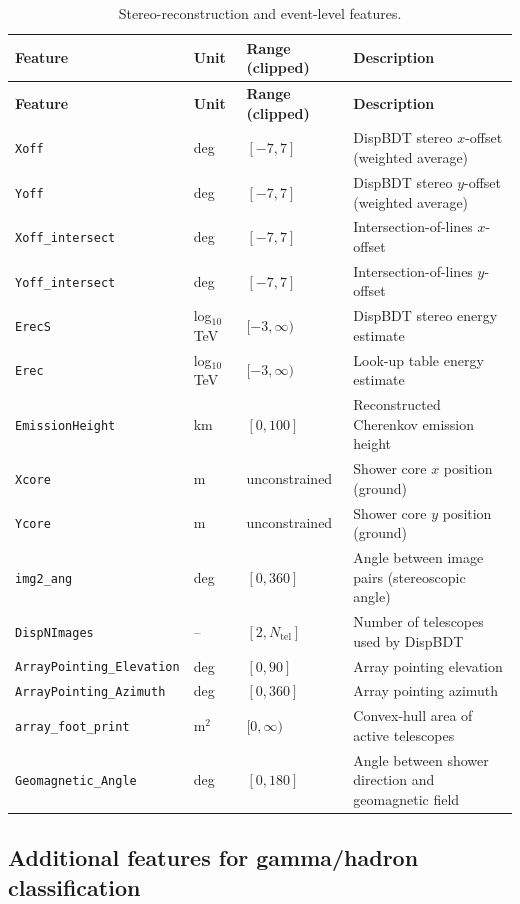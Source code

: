 \documentclass[12pt]{article}
\begin{document}
\begin{longtable}{lll p{5.5cm}}
\caption{Stereo-reconstruction and event-level features.} \label{tab:features-stereo} \\
\hline
\textbf{Feature} & \textbf{Unit} & \textbf{Range (clipped)} & \textbf{Description} \\
\hline
\endfirsthead
\hline
\textbf{Feature} & \textbf{Unit} & \textbf{Range (clipped)} & \textbf{Description} \\
\hline
\endhead
\hline
\endfoot
\texttt{Xoff} & deg & $[-7,7]$ & DispBDT stereo $x$-offset (weighted average) \\
\texttt{Yoff} & deg & $[-7,7]$ & DispBDT stereo $y$-offset (weighted average) \\
\texttt{Xoff\_intersect} & deg & $[-7,7]$ & Intersection-of-lines $x$-offset \\
\texttt{Yoff\_intersect} & deg & $[-7,7]$ & Intersection-of-lines $y$-offset \\
\texttt{ErecS} & log$_{10}$ TeV & $[-3,\infty)$ & DispBDT stereo energy estimate \\
\texttt{Erec} & log$_{10}$ TeV & $[-3,\infty)$ & Look-up table energy estimate \\
\texttt{EmissionHeight} & km & $[0,100]$ & Reconstructed Cherenkov emission height \\
\texttt{Xcore} & m & unconstrained & Shower core $x$ position (ground) \\
\texttt{Ycore} & m & unconstrained & Shower core $y$ position (ground) \\
\texttt{img2\_ang} & deg & $[0,360]$ & Angle between image pairs (stereoscopic angle) \\
\texttt{DispNImages} & -- & $[2, N_\mathrm{tel}]$ & Number of telescopes used by DispBDT \\
\texttt{ArrayPointing\_Elevation} & deg & $[0,90]$ & Array pointing elevation \\
\texttt{ArrayPointing\_Azimuth} & deg & $[0,360]$ & Array pointing azimuth \\
\texttt{array\_foot\_print} & m$^2$ & $[0,\infty)$ & Convex-hull area of active telescopes \\
\texttt{Geomagnetic\_Angle} & deg & $[0,180]$ & Angle between shower direction and geomagnetic field \\
\end{longtable}

\subsection{Additional features for gamma/hadron classification}
\end{document}
